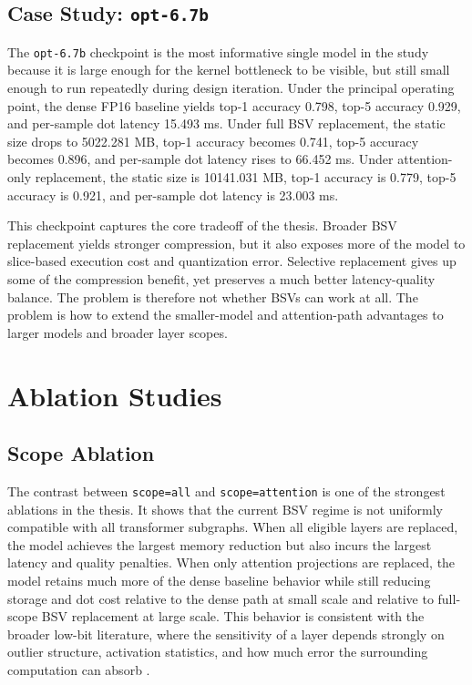 \subsection{Case Study: \texttt{opt-6.7b}}
The \texttt{opt-6.7b} checkpoint is the most informative single model in the study because it is large enough for the kernel bottleneck to be visible, but still small enough to run repeatedly during design iteration. Under the principal operating point, the dense FP16 baseline yields top-1 accuracy 0.798, top-5 accuracy 0.929, and per-sample dot latency 15.493 ms. Under full BSV replacement, the static size drops to 5022.281 MB, top-1 accuracy becomes 0.741, top-5 accuracy becomes 0.896, and per-sample dot latency rises to 66.452 ms. Under attention-only replacement, the static size is 10141.031 MB, top-1 accuracy is 0.779, top-5 accuracy is 0.921, and per-sample dot latency is 23.003 ms.

This checkpoint captures the core tradeoff of the thesis. Broader BSV replacement yields stronger compression, but it also exposes more of the model to slice-based execution cost and quantization error. Selective replacement gives up some of the compression benefit, yet preserves a much better latency-quality balance. The problem is therefore not whether BSVs can work at all. The problem is how to extend the smaller-model and attention-path advantages to larger models and broader layer scopes.

\section{Ablation Studies}\label{sec:ablation}
\subsection{Scope Ablation}
The contrast between \texttt{scope=all} and \texttt{scope=attention} is one of the strongest ablations in the thesis. It shows that the current BSV regime is not uniformly compatible with all transformer subgraphs. When all eligible layers are replaced, the model achieves the largest memory reduction but also incurs the largest latency and quality penalties. When only attention projections are replaced, the model retains much more of the dense baseline behavior while still reducing storage and dot cost relative to the dense path at small scale and relative to full-scope BSV replacement at large scale. This behavior is consistent with the broader low-bit literature, where the sensitivity of a layer depends strongly on outlier structure, activation statistics, and how much error the surrounding computation can absorb \cite{llmint8,awq,smoothquant}.

